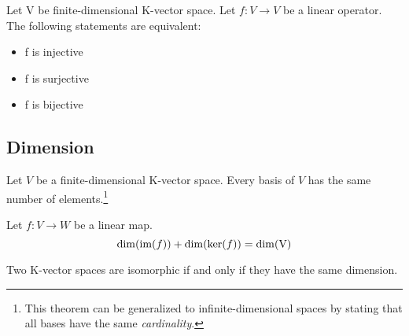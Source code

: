         \begin{theorem}
		Let V be finite-dimensional K-vector space. Let $f:V\rightarrow V$ be a linear operator. The following statements are equivalent:
        	\begin{itemize}
            		\item f is injective
			\item f is surjective
                	\item f is bijective
		\end{itemize}
	\end{theorem}
        
\subsection{Dimension}

        \begin{property}
		Let $V$ be a finite-dimensional K-vector space. Every basis of $V$ has the same number of elements.\footnote{This theorem can be generalized to infinite-dimensional spaces by stating that all bases have the same \textit{cardinality}.}
	\end{property}

        \begin{theorem}
		Let $f: V \rightarrow W$ be a linear map.
	        \begin{equation}
	                \label{linalgebra:dimension_theorem}
	                \dim(\text{\upshape im}(f)) + \dim(\text{\upshape ker}(f)) = \dim(\text{\upshape V})
	        \end{equation}
        \end{theorem}

        \begin{theorem}\label{linalgebra:isomorphic_dimension}
		Two K-vector spaces are isomorphic if and only if they have the same dimension.
	\end{theorem}
